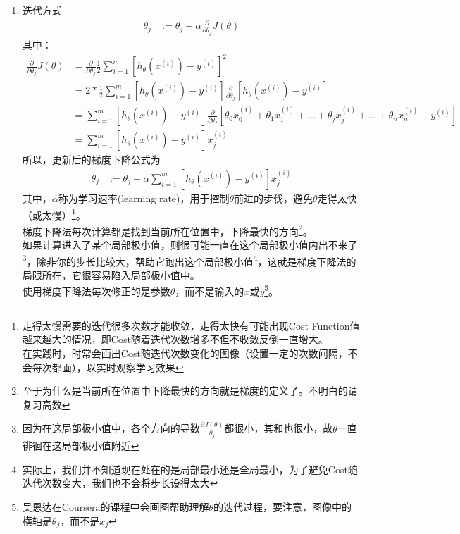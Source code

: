 \begin{enumerate}
	\item 迭代方式
	\begin{equation}\begin{aligned}
	      \theta_j &:= \theta_j - \alpha \frac{\partial} {\partial \theta_j} J(\theta)
	\end{aligned}\end{equation}
	其中：
	\begin{equation}\begin{aligned}
	      \frac{\partial} {\partial \theta_j} J(\theta) &= \frac{\partial}{\partial \theta_j} \frac{1}{2} \sum_{i=1}^m\left[ h_\theta(x^{(i)}) - y^{(i)} \right]^2 \\
	      &= 2 * \frac{1}{2} \sum_{i=1}^m\left[ h_\theta(x^{(i)}) - y^{(i)} \right] \frac{\partial}{\partial\theta_j}\left[ h_\theta(x^{(i)}) - y^{(i)} \right] \\
	      &= \sum_{i=1}^m\left[ h_\theta(x^{(i)}) - y^{(i)} \right]\frac{\partial}{\partial\theta_j}\left[ \theta_0x_0^{(i)} +  \theta_1x_1^{(i)} + \dots + \theta_jx_j^{(i)} + ... + \theta_nx_n^{(i)} - y^{(i)} \right] \\
	      &= \sum_{i=1}^m\left[ h_\theta(x^{(i)}) - y^{(i)} \right]x_j^{(i)}
	\end{aligned}\end{equation}
	所以，更新后的梯度下降公式为
	\begin{equation}\begin{aligned}
		\theta_j &:= \theta_j - \alpha \sum_{i=1}^m \left[ h_\theta(x^{(i)}) - y^{(i)} \right]x_j^{(i)}
	\end{aligned}\end{equation}
	其中，$\alpha$称为学习速率(learning rate)，用于控制$\theta$前进的步伐，避免$\theta$走得太快（或太慢）\footnote{走得太慢需要的迭代很多次数才能收敛，走得太快有可能出现Cost Function值越来越大的情况，即Cost随着迭代次数增多不但不收敛反倒一直增大。\\
	在实践时，时常会画出Cost随迭代次数变化的图像（设置一定的次数间隔，不会每次都画），以实时观察学习效果}。\\
	梯度下降法每次计算都是找到当前所在位置中，下降最快的方向\footnote{至于为什么是当前所在位置中下降最快的方向就是梯度的定义了。不明白的请复习高数}。 \\
	如果计算进入了某个局部极小值，则很可能一直在这个局部极小值内出不来了\footnote{因为在这局部极小值中，各个方向的导数$\frac{\partial{J(\theta)}}{\theta_j}$都很小，其和也很小，故$\theta$一直徘徊在这局部极小值附近}，除非你的步长比较大，帮助它跑出这个局部极小值\footnote{实际上，我们并不知道现在处在的是局部最小还是全局最小，为了避免Cost随迭代次数变大，我们也不会将步长设得太大}，这就是梯度下降法的局限所在，它很容易陷入局部极小值中。 \\
	使用梯度下降法每次修正的是参数$\theta$，而不是输入的$x$或$y$\footnote{吴恩达在Coursera的课程中会画图帮助理解$\theta$的迭代过程，要注意，图像中的横轴是$\theta_j$，而不是$x_j$}。
\end{enumerate}


